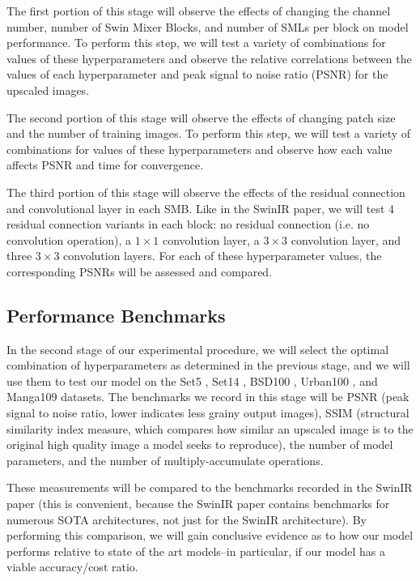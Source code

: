 \documentclass{article}
\begin{document}
The first portion of this stage will observe the effects of changing the channel number, number of Swin Mixer Blocks, and number of SMLs per block on model performance. To perform this step, we will test a variety of combinations for values of these hyperparameters and observe the relative correlations between the values of each hyperparameter and peak signal to noise ratio (PSNR) for the upscaled images.

The second portion of this stage will observe the effects of changing patch size and the number of training images. To perform this step, we will test a variety of combinations for values of these hyperparameters and observe how each value affects PSNR and time for convergence.

The third portion of this stage will observe the effects of the residual connection and convolutional layer in each SMB. Like in the SwinIR paper, we will test 4 residual connection variants in each block: no residual connection (i.e. no convolution operation), a $1 \times 1$ convolution layer, a $3 \times 3$ convolution layer, and three $3 \times 3$ convolution layers. For each of these hyperparameter values, the corresponding PSNRs will be assessed and compared.

\subsection{Performance Benchmarks}

In the second stage of our experimental procedure, we will select the optimal combination of hyperparameters as determined in the previous stage, and we will use them to test our model on the Set5 \citep{Set5}, Set14 \citep{Set14}, BSD100 \citep{BSD100}, Urban100 \citep{Urban100}, and Manga109 \citep{Manga109} datasets. The benchmarks we record in this stage will be PSNR (peak signal to noise ratio, lower indicates less grainy output images), SSIM (structural similarity index measure, which compares how similar an upscaled image is to the original high quality image a model seeks to reproduce), the number of model parameters, and the number of multiply-accumulate operations.

These measurements will be compared to the benchmarks recorded in the SwinIR paper (this is convenient, because the SwinIR paper contains benchmarks for numerous SOTA architectures, not just for the SwinIR architecture). By performing this comparison, we will gain conclusive evidence as to how our model performs relative to state of the art models–in particular, if our model has a viable accuracy/cost ratio.
\end{document}
